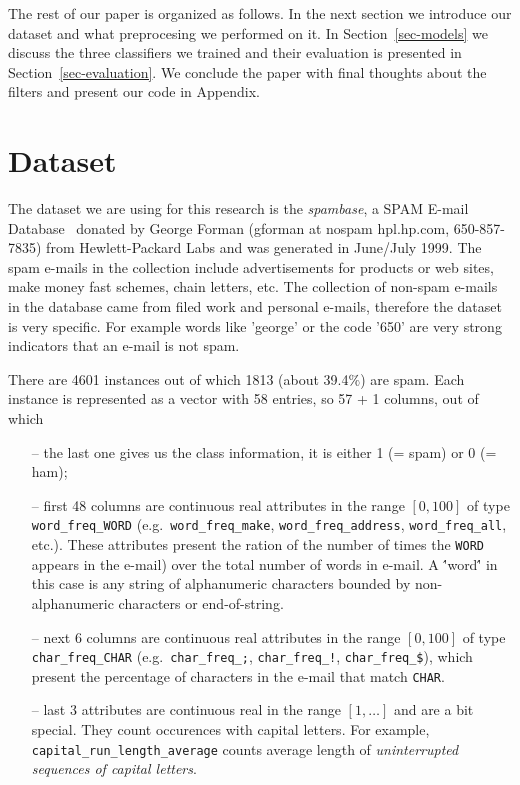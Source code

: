 \documentclass[12pt,a4paper]{article}
\begin{document}
The rest of our paper is organized as follows. In the next section we introduce our dataset and what preprocesing we performed on it. In Section~\ref{sec-models} we discuss the three classifiers we trained and their evaluation is presented in Section~\ref{sec-evaluation}. We conclude the paper with final thoughts about the filters and present our code in Appendix.

\section{Dataset}
\label{sec-data}

The dataset we are using for this research is the {\em spambase}, a SPAM E-mail Database~\cite{spambase} donated by George Forman (gforman at nospam hpl.hp.com, 650-857-7835) from Hewlett-Packard Labs and was generated in June/July 1999. 
The spam e-mails in the collection include advertisements for products or web sites, make money fast schemes, chain letters, etc. The collection of non-spam e-mails in the database came from filed work and personal e-mails, therefore the dataset is very specific. For example words like 'george' or the code '650' are very strong indicators that an e-mail is not spam. 

There are 4601 instances out of which 1813 (about 39.4$\%$) are spam. Each instance is represented as a vector with 58 entries, so 57 + 1 columns, out of which
\begin{itemize}
  \item[--] the last one gives us the class information, it is either 1 (= spam) or 0 (= ham);
  \item[--] first 48 columns are continuous real attributes in the range $[0,100]$ of type {\tt word\_freq\_WORD} (e.g.\ {\tt word\_freq\_make}, {\tt word\_freq\_address}, {\tt word\_freq\_all}, etc.). 
  These attributes present the ration of the number of times the {\tt WORD} appears in the e-mail) over the total number of words in e-mail.  A \''word\'' in this case is any 
string of alphanumeric characters bounded by non-alphanumeric characters or end-of-string.
  \item[--] next 6 columns are continuous real attributes in the range $[0,100]$ of type {\tt char\_freq\_CHAR} (e.g.\ {\tt char\_freq\_;}, {\tt char\_freq\_!}, {\tt char\_freq\_\$}), 
  which present the percentage of characters in the e-mail that match {\tt CHAR}.
  \item[--] last 3 attributes are continuous real in the range $[1,\ldots ]$ and are a bit special. They count occurences with capital letters. For example, {\tt capital\_run\_length\_average} counts average length of {\em uninterrupted sequences of capital letters}.
\end{itemize}
\end{document}
